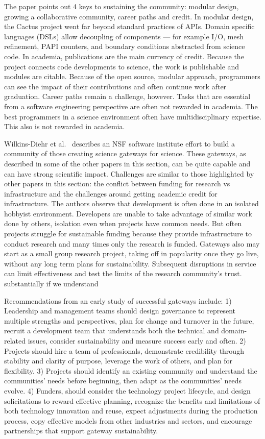 \documentclass[11pt, oneside]{amsart}
\begin{document}
The paper points out 4 keys to sustaining the community: modular
design, growing a collaborative community, career paths and credit. In
modular design, the Cactus project went far beyond standard practices
of APIs. Domain specific languages (DSLs) allow decoupling of
components --- for example I/O, mesh refinement, PAPI counters, and
boundary conditions abstracted from science code. In academia,
publications are the main currency of credit. Because the project
connects code developments to science, the work is publishable and
modules are citable. Because of the open source, modular approach,
programmers can see the impact of their contributions and often
continue work after graduation. Career paths remain a challenge,
however. Tasks that are essential from a software engineering
perspective are often not rewarded in academia. The best programmers
in a science environment often have multidisciplinary expertise. This
also is not rewarded in academia.

Wilkins-Diehr et al.~\cite{Wilkins-Diehr_WSSSPE} describes an NSF
software institute effort to build a community of those creating
science gateways for science. These gateways, as described in some of
the other papers in this section, can be quite capable and can have
strong scientific impact.  Challenges are similar to those highlighted
by other papers in this section: the conflict between funding for
research vs infrastructure and the challenges around getting academic
credit for infrastructure.
%
The authors observe that development is often done in an isolated
hobbyist environment. Developers are unable to take advantage of
similar work done by others, isolation even when projects have common
needs. But often projects struggle for sustainable funding because
they provide infrastructure to conduct research and many times only
the research is funded. Gateways also may start as a small group
research project, taking off in popularity once they go live, without
any long term plans for sustainability.  Subsequent disruptions in
service can limit effectiveness and test the limits of the research
community's trust. %
substantially if we understand

Recommendations from an early study of successful gateways include: 1)
Leadership and management teams should design governance to represent
multiple strengths and perspectives, plan for change and turnover in
the future, recruit a development team that understands both the
technical and domain-related issues, consider sustainability and
measure success early and often. 2) Projects should hire a team of
professionals, demonstrate credibility through stability and clarity
of purpose, leverage the work of others, and plan for flexibility. 3)
Projects should identify an existing community and understand the
communities' needs before beginning, then adapt as the communities'
needs evolve. 4) Funders, should consider the technology project
lifecycle, and design solicitations to reward effective planning,
recognize the benefits and limitations of both technology innovation
and reuse, expect adjustments during the production process, copy
effective models from other industries and sectors, and encourage
partnerships that support gateway sustainability.
\end{document}
